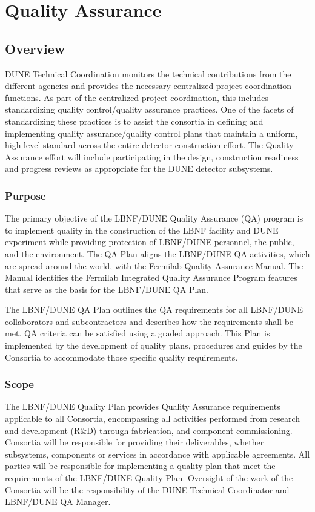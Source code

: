 \chapter{Quality Assurance}
\label{vl:tc-QA}

\section{Overview}

DUNE Technical Coordination monitors the technical contributions from
the different agencies and provides the necessary centralized project
coordination functions. As part of the centralized project
coordination, this includes standardizing quality control/quality
assurance practices. One of the facets of standardizing these
practices is to assist the consortia in defining and implementing
quality assurance/quality control plans that maintain a uniform,
high-level standard across the entire detector construction
effort. The Quality Assurance effort will include participating in the
design, construction readiness and progress reviews as appropriate for
the DUNE detector subsystems.

\subsection{Purpose}

The primary objective of the LBNF/DUNE Quality Assurance (QA) program
is to implement quality in the construction of the LBNF facility and
DUNE experiment while providing protection of LBNF/DUNE personnel, the
public, and the environment. The QA Plan aligns the LBNF/DUNE QA
activities, which are spread around the world, with the Fermilab
Quality Assurance Manual. The Manual identifies the Fermilab
Integrated Quality Assurance Program features that serve as the basis
for the LBNF/DUNE QA Plan.

The LBNF/DUNE QA Plan outlines the QA requirements for all LBNF/DUNE
collaborators and subcontractors and describes how the requirements
shall be met. QA criteria can be satisfied using a graded
approach. This Plan is implemented by the development of quality
plans, procedures and guides by the Consortia to accommodate those
specific quality requirements.

\subsection{Scope}

The LBNF/DUNE Quality Plan provides Quality Assurance requirements
applicable to all Consortia, encompassing all activities performed
from research and development (R\&D) through fabrication, and component
commissioning. Consortia will be responsible for providing their
deliverables, whether subsystems, components or services in accordance
with applicable agreements. All parties will be responsible for
implementing a quality plan that meet the requirements of the
LBNF/DUNE Quality Plan. Oversight of the work of the Consortia will be
the responsibility of the DUNE Technical Coordinator and LBNF/DUNE QA
Manager.

